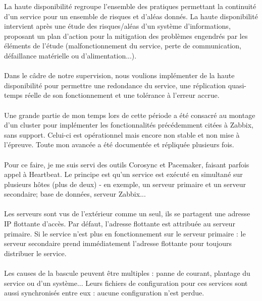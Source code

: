 La haute disponibilité regroupe l'ensemble des pratiques permettant la continuité d'un service pour un ensemble de risques et d'aléas donnés. La haute disponibilité intervient après une étude des risques/aléas d'un système d'informations, proposant un plan d'action pour la mitigation des problèmes engendrés par les éléments de l'étude (malfonctionnement du service, perte de communication, défaillance matérielle ou d'alimentation...).
\\ \\
Dans le câdre de notre supervision, nous voulions implémenter de la haute disponibilité pour permettre une redondance du service, une réplication quasi-temps réelle de son fonctionnement et une tolérance à l'erreur accrue.
\\ \\
Une grande partie de mon temps lors de cette période a été consacré au montage d'un cluster pour implémenter les fonctionnalités précédemment citées à Zabbix, sans support. Celui-ci est opérationnel mais encore non stable et non mise à l'épreuve. Toute mon avancée a été documentée et répliquée plusieurs fois.
\\ \\
Pour ce faire, je me suis servi des outils Corosync et Pacemaker, faisant parfois appel à Heartbeat. Le principe est qu'un service est exécuté en simultané sur plusieurs hôtes (plus de deux) - en exemple, un serveur primaire et un serveur secondaire; base de données, serveur Zabbix...
\\ \\
Les serveurs sont vus de l'extérieur comme un seul, ils se partagent une adresse IP flottante d'accès. Par défaut, l'adresse flottante est attribuée au serveur primaire. Si le service n'est plus en fonctionnement sur le serveur primaire : le serveur secondaire prend immédiatement l'adresse flottante pour toujours distribuer le service.
\\ \\
Les causes de la bascule peuvent être multiples : panne de courant, plantage du service ou d'un système... Leurs fichiers de configuration pour ces services sont aussi synchronisés entre eux : aucune configuration n'est perdue.


